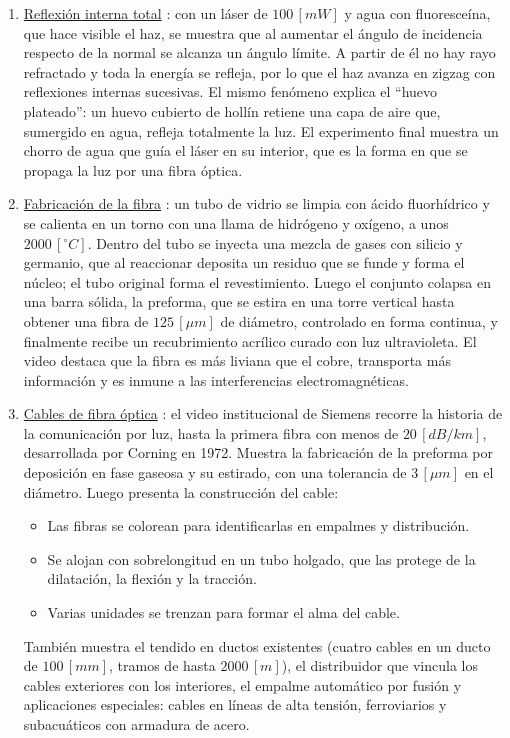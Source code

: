 \begin{enumerate}
    \item \underline{Reflexión interna total} \cite{video1}: con un láser de $100 \, [mW]$ y agua con fluoresceína, que hace visible el haz, se muestra que al aumentar el ángulo de incidencia respecto de la normal se alcanza un ángulo límite. A partir de él no hay rayo refractado y toda la energía se refleja, por lo que el haz avanza en zigzag con reflexiones internas sucesivas. El mismo fenómeno explica el ``huevo plateado'': un huevo cubierto de hollín retiene una capa de aire que, sumergido en agua, refleja totalmente la luz. El experimento final muestra un chorro de agua que guía el láser en su interior, que es la forma en que se propaga la luz por una fibra óptica.
    \item \underline{Fabricación de la fibra} \cite{video2}: un tubo de vidrio se limpia con ácido fluorhídrico y se calienta en un torno con una llama de hidrógeno y oxígeno, a unos $2000 \, [^\circ C]$. Dentro del tubo se inyecta una mezcla de gases con silicio y germanio, que al reaccionar deposita un residuo que se funde y forma el núcleo; el tubo original forma el revestimiento. Luego el conjunto colapsa en una barra sólida, la preforma, que se estira en una torre vertical hasta obtener una fibra de $125 \, [\mu m]$ de diámetro, controlado en forma continua, y finalmente recibe un recubrimiento acrílico curado con luz ultravioleta. El video destaca que la fibra es más liviana que el cobre, transporta más información y es inmune a las interferencias electromagnéticas.
    \item \underline{Cables de fibra óptica} \cite{video3}: el video institucional de Siemens recorre la historia de la comunicación por luz, hasta la primera fibra con menos de $20 \, [dB/km]$, desarrollada por Corning en 1972. Muestra la fabricación de la preforma por deposición en fase gaseosa y su estirado, con una tolerancia de $3 \, [\mu m]$ en el diámetro. Luego presenta la construcción del cable:
    \begin{itemize}
        \item Las fibras se colorean para identificarlas en empalmes y distribución.
        \item Se alojan con sobrelongitud en un tubo holgado, que las protege de la dilatación, la flexión y la tracción.
        \item Varias unidades se trenzan para formar el alma del cable.
    \end{itemize}
    También muestra el tendido en ductos existentes (cuatro cables en un ducto de $100 \, [mm]$, tramos de hasta $2000 \, [m]$), el distribuidor que vincula los cables exteriores con los interiores, el empalme automático por fusión y aplicaciones especiales: cables en líneas de alta tensión, ferroviarios y subacuáticos con armadura de acero.

\end{enumerate}
